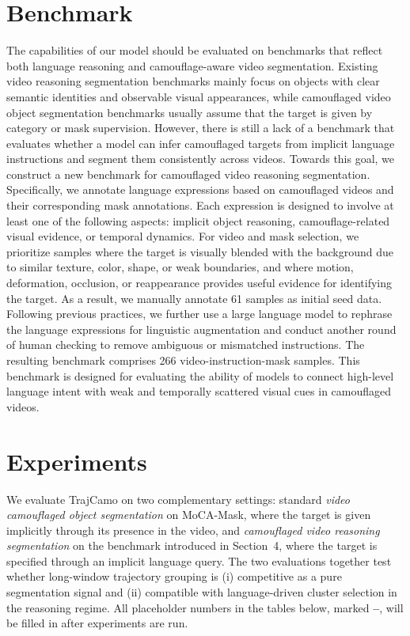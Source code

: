 \documentclass[11pt]{article}
\newcommand{\TBD}{\textcolor{red!70!black}{\textbf{--}}}
\begin{document}
\section{Benchmark}

The capabilities of our model should be evaluated on benchmarks that reflect both language reasoning and camouflage-aware video segmentation. Existing video reasoning segmentation benchmarks mainly focus on objects with clear semantic identities and observable visual appearances, while camouflaged video object segmentation benchmarks usually assume that the target is given by category or mask supervision. However, there is still a lack of a benchmark that evaluates whether a model can infer camouflaged targets from implicit language instructions and segment them consistently across videos. Towards this goal, we construct a new benchmark for camouflaged video reasoning segmentation. Specifically, we annotate language expressions based on camouflaged videos and their corresponding mask annotations. Each expression is designed to involve at least one of the following aspects: implicit object reasoning, camouflage-related visual evidence, or temporal dynamics. For video and mask selection, we prioritize samples where the target is visually blended with the background due to similar texture, color, shape, or weak boundaries, and where motion, deformation, occlusion, or reappearance provides useful evidence for identifying the target. As a result, we manually annotate 61 samples as initial seed data. Following previous practices, we further use a large language model to rephrase the language expressions for linguistic augmentation and conduct another round of human checking to remove ambiguous or mismatched instructions. The resulting benchmark comprises 266 video-instruction-mask samples. This benchmark is designed for evaluating the ability of models to connect high-level language intent with weak and temporally scattered visual cues in camouflaged videos.






\section{Experiments}

We evaluate TrajCamo on two complementary settings: standard \emph{video camouflaged object segmentation} on MoCA-Mask, where the target is given implicitly through its presence in the video, and \emph{camouflaged video reasoning segmentation} on the benchmark introduced in Section~4, where the target is specified through an implicit language query.
The two evaluations together test whether long-window trajectory grouping is (i) competitive as a pure segmentation signal and (ii) compatible with language-driven cluster selection in the reasoning regime.
All placeholder numbers in the tables below, marked \TBD, will be filled in after experiments are run.
\end{document}

